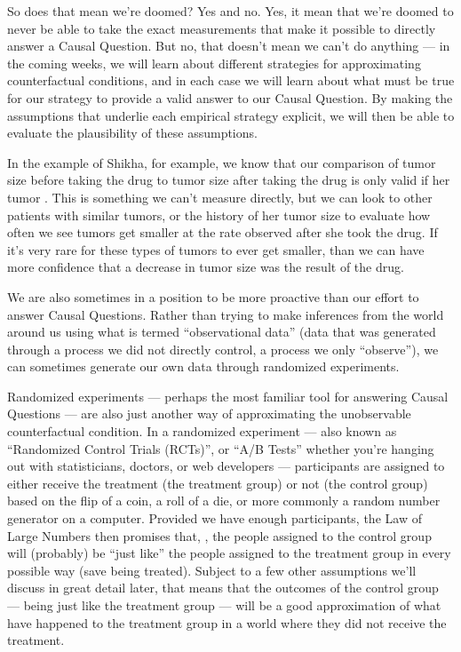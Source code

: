 \documentclass[letterpaper,10pt,english]{jupyterBook}
\begin{document}
\sphinxAtStartPar
So does that mean we’re doomed? Yes and no. Yes, it  mean that we’re doomed to never be able to take the exact measurements that make it possible to directly answer a Causal Question. But no, that doesn’t mean we can’t do anything — in the coming weeks, we will learn about different strategies for approximating counterfactual conditions, and in each case we will learn about what  must be true for our strategy to provide a valid answer to our Causal Question. By making the assumptions that underlie each empirical strategy explicit, we will then be able to evaluate the plausibility of these assumptions.

\sphinxAtStartPar
In the example of Shikha, for example, we know that our comparison of tumor size before taking the drug to tumor size after taking the drug is only valid if her tumor . This is something we can’t measure directly, but we can look to other patients with similar tumors, or the history of her tumor size to evaluate how often we see tumors get smaller at the rate observed after she took the drug. If it’s very rare for these types of tumors to ever get smaller, than we can have more confidence that a decrease in tumor size was the result of the drug.

\sphinxAtStartPar
We are also sometimes in a position to be more proactive than our effort to answer Causal Questions. Rather than trying to make inferences from the world around us using what is termed “observational data” (data that was generated through a process we did not directly control, a process we only “observe”), we can sometimes generate our own data through randomized experiments.

\sphinxAtStartPar
Randomized experiments — perhaps the most familiar tool for answering Causal Questions — are also just another way of approximating the unobservable counterfactual condition. In a randomized experiment — also known as “Randomized Control Trials (RCTs)”, or “A/B Tests” whether you’re hanging out with statisticians, doctors, or web developers — participants are assigned to either receive the treatment (the treatment group) or not (the control group) based on the flip of a coin, a roll of a die, or more commonly a random number generator on a computer. Provided we have enough participants, the Law of Large Numbers then promises that, , the people assigned to the control group will (probably) be “just like” the people assigned to the treatment group in every possible way (save being treated). Subject to a few other assumptions we’ll discuss in great detail later, that means that the outcomes of the control group — being just like the treatment group  — will be a good approximation of what  have happened to the treatment group in a world where they did not receive the treatment.
\end{document}
